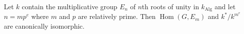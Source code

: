 Let $k$ contain the multiplicative group $E_n$ of $n$th roots of unity in $k_{\text{Alg}}$ and let $n = mp^e$ where $m$ and $p$ are relatively prime. Then $\operatorname{Hom}(G, E_m)$ and $k^*/k^{m^e}$ are canonically isomorphic.
